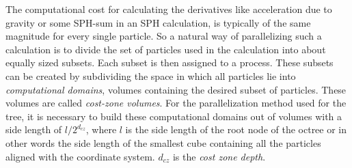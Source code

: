 The computational cost for calculating the derivatives like acceleration due to gravity or some SPH-sum in an SPH calculation, is typically of the same magnitude for every single particle. So a natural way of parallelizing such a calculation is to divide the set of particles used in the calculation into about equally sized subsets. Each subset is then assigned to a process. These subsets can be created by subdividing the space in which all particles lie into \emph{computational domains}, volumes containing the desired subset of particles. These volumes are called \emph{cost-zone volumes}. For the parallelization method used for the tree, it is necessary to build these computational domains out of volumes with a side length of $l / 2^{d_{cz}}$, where $l$ is the side length of the root node of the octree or in other words the side length of the smallest cube containing all the particles aligned with the coordinate system. $d_{cz}$ is the \emph{cost zone depth}.
